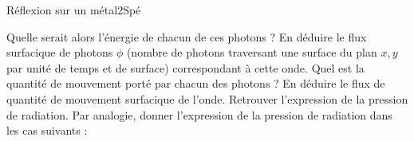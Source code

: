 \begin{exercise}{Réflexion sur un métal}{2}{Spé}
\begin{questions}
    \question Quelle serait alors l'énergie de chacun de ces photons ?
    \question En déduire le flux surfacique de photons $\phi$ (nombre de photons traversant une surface du plan $x,y$ par unité de temps et de surface) correspondant à cette onde.
    \question Quel est la quantité de mouvement porté par chacun des photons ? En déduire le flux de quantité de mouvement surfacique de l'onde.
    \question Retrouver l'expression de la pression de radiation.
    \question Par analogie, donner l'expression de la pression de radiation dans les cas suivants :
\end{questions}

\end{exercise}

